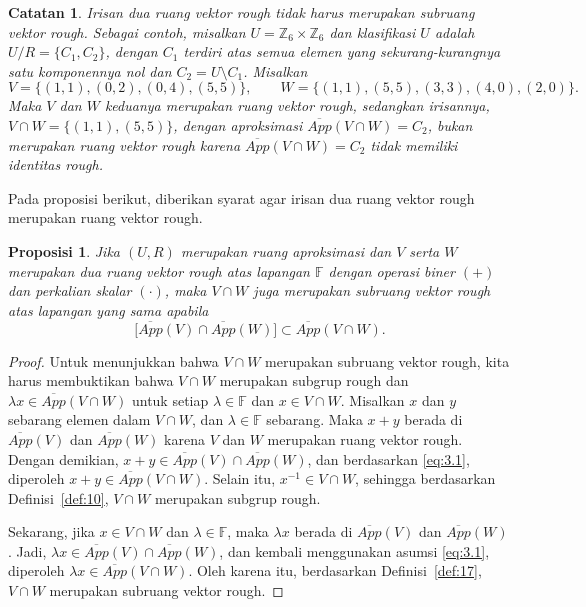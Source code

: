 \documentclass[a4paper,11pt]{article}
\theoremstyle{plain}
\newtheorem{catatan}[definisi]{Catatan}
\newtheorem{proposisi}[definisi]{Proposisi}
\newcommand{\F}{\mathbb{F}}
\newcommand{\Z}{\mathbb{Z}}
\newcommand{\upp}[1]{\overline{App}(#1)}
\begin{document}
\begin{catatan}\label{rem:22}
      Irisan dua ruang vektor rough tidak harus merupakan subruang vektor
      rough. Sebagai contoh, misalkan $U=\Z_6\times\Z_6$ dan klasifikasi
      $U$ adalah $U/R=\{C_1,C_2\}$, dengan $C_1$ terdiri atas semua elemen
      yang sekurang-kurangnya satu komponennya nol dan $C_2=U\setminus C_1$.
      Misalkan
      \[
            V=\{(1,1),(0,2),(0,4),(5,5)\},\qquad
            W=\{(1,1),(5,5),(3,3),(4,0),(2,0)\}.
      \]
      Maka $V$ dan $W$ keduanya merupakan ruang vektor rough, sedangkan
      irisannya, $V\cap W=\{(1,1),(5,5)\}$, dengan aproksimasi
      $\upp{V\cap W}=C_2$, bukan merupakan ruang vektor rough karena
      $\upp{V\cap W}=C_2$ tidak memiliki identitas rough.
\end{catatan}

Pada proposisi berikut, diberikan syarat agar irisan dua ruang vektor
rough merupakan ruang vektor rough.

\begin{proposisi}\label{prop:23}
      Jika $(U,R)$ merupakan ruang aproksimasi dan $V$ serta $W$ merupakan
      dua ruang vektor rough atas lapangan $\F$ dengan operasi biner $(+)$
      dan perkalian skalar $(\cdot)$, maka $V\cap W$ juga merupakan subruang
      vektor rough atas lapangan yang sama apabila
      \begin{equation}
            \bigl[\upp{V}\cap\upp{W}\bigr]\subset\upp{V\cap W}.
            \tag{3.1}\label{eq:3.1}
      \end{equation}
\end{proposisi}
\begin{proof}
      Untuk menunjukkan bahwa $V\cap W$ merupakan subruang vektor rough,
      kita harus membuktikan bahwa $V\cap W$ merupakan subgrup rough dan
      $\lambda x\in\upp{V\cap W}$ untuk setiap $\lambda\in\F$ dan
      $x\in V\cap W$. Misalkan $x$ dan $y$ sebarang elemen dalam
      $V\cap W$, dan $\lambda\in\F$ sebarang. Maka $x+y$ berada di
      $\upp{V}$ dan $\upp{W}$ karena $V$ dan $W$ merupakan ruang vektor
      rough. Dengan demikian, $x+y\in\upp{V}\cap\upp{W}$, dan berdasarkan
      \eqref{eq:3.1}, diperoleh $x+y\in\upp{V\cap W}$. Selain itu,
      $x^{-1}\in V\cap W$, sehingga berdasarkan Definisi~\ref{def:10},
      $V\cap W$ merupakan subgrup rough.

      Sekarang, jika $x\in V\cap W$ dan $\lambda\in\F$, maka
      $\lambda x$ berada di $\upp{V}$ dan $\upp{W}$. Jadi,
      $\lambda x\in\upp{V}\cap\upp{W}$, dan kembali menggunakan asumsi
      \eqref{eq:3.1}, diperoleh $\lambda x\in\upp{V\cap W}$. Oleh karena
      itu, berdasarkan Definisi~\ref{def:17}, $V\cap W$ merupakan subruang
      vektor rough.
\end{proof}
\end{document}
